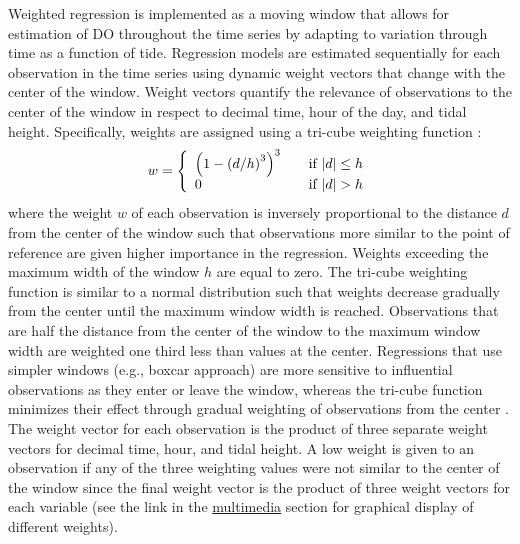 \documentclass[letterpaper,12pt,oneside]{article}\usepackage[]{graphicx}\usepackage[]{color}
\begin{document}
Weighted regression is implemented as a moving window that allows for estimation of \ac{DO} throughout the time series by adapting to variation through time as a function of tide. Regression models are estimated sequentially for each observation in the time series using dynamic weight vectors that change with the center of the window.  Weight vectors quantify the relevance of observations to the center of the window in respect to decimal time, hour of the day, and tidal height.  Specifically, weights are assigned using a tri-cube weighting function \citep{Hirsch10}:
\begin{equation}
w= \left\{ 
  \begin{array}{l l}
    \left(1-\left(d/h\right)^3\right)^3 & \quad \textrm{if } |d| \leq h \\
    0 & \quad \textrm{if } |d| > h 
  \end{array} \right.
\end{equation}
where the weight $w$ of each observation is inversely proportional to the distance $d$ from the center of the window such that observations more similar to the point of reference are given higher importance in the regression.  Weights exceeding the maximum width of the window $h$ are equal to zero.  The tri-cube weighting function is similar to a normal distribution such that weights decrease gradually from the center until the maximum window width is reached.  Observations that are half the distance from the center of the window to the maximum window width are weighted one third less than values at the center.  Regressions that use simpler windows (e.g., boxcar approach) are  more sensitive to influential observations as they enter or leave the window, whereas the tri-cube function minimizes their effect through gradual weighting of observations from the center \citep{Hirsch10}.  The weight vector for each observation is the product of three separate weight vectors for decimal time, hour, and tidal height. A low weight is given to an observation if any of the three weighting values were not similar to the center of the window since the final weight vector is the product of three weight vectors for each variable (see the link in the \hyperref[multi]{multimedia} section for graphical display of different weights).    
\end{document}
